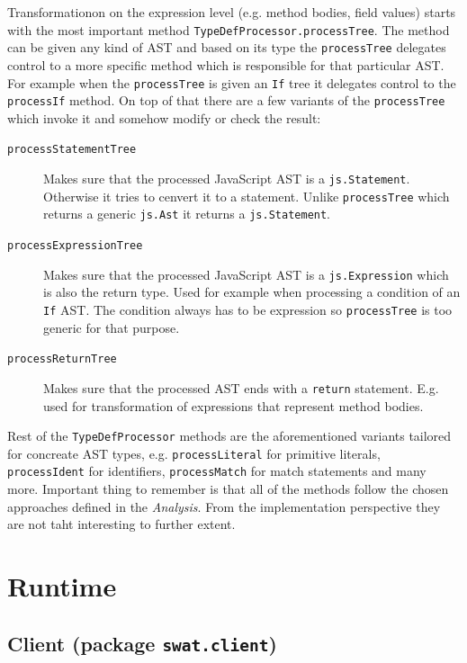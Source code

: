 \documentclass[12pt,a4paper]{report}
\begin{document}
Transformationon on the expression level (e.g. method bodies, field values) starts with the most important method \texttt{TypeDefProcessor.processTree}. The method can be given any kind of AST and based on its type the \texttt{processTree} delegates control to a more specific method which is responsible for that particular AST. For example when the \texttt{processTree} is given an \texttt{If} tree it delegates control to the \texttt{processIf} method. On top of that there are a few variants of the \texttt{processTree} which invoke it and somehow modify or check the result: 

\begin{description}
\item[\texttt{processStatementTree}] Makes sure that the processed JavaScript AST is a \texttt{js.Statement}. Otherwise it tries to cenvert it to a statement. Unlike \texttt{processTree} which returns a generic \texttt{js.Ast} it returns a \texttt{js.Statement}.
\item[\texttt{processExpressionTree}] Makes sure that the processed JavaScript AST is a \texttt{js.Expression} which is also the return type. Used for example when processing a condition of an \texttt{If} AST. The condition always has to be expression so \texttt{processTree} is too generic for that purpose.
\item[\texttt{processReturnTree}] Makes sure that the processed AST ends with a \texttt{return} statement. E.g. used for transformation of expressions that represent method bodies.
\end{description}

Rest of the \texttt{TypeDefProcessor} methods are the aforementioned variants tailored for concreate AST types, e.g. \texttt{processLiteral} for primitive literals, \texttt{processIdent} for identifiers, \texttt{processMatch} for match statements and many more. Important thing to remember is that all of the methods follow the chosen approaches defined in the {\it Analysis}. From the implementation perspective they are not taht interesting to further extent.

\section{Runtime}

\subsection{Client (package \texttt{swat.client})}
\end{document}
